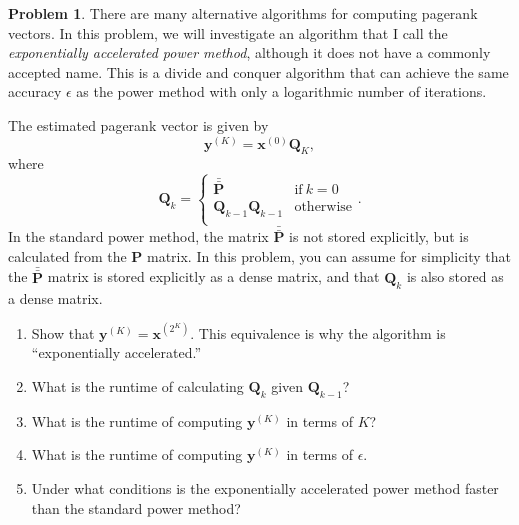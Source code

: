 \documentclass[10pt]{article}
\theoremstyle{definition}
\newtheorem{problem}{Problem}
\newcommand{\Q}{\mathbf Q}
\newcommand{\p}{\mathbf P}
\newcommand{\pb}{\bar {\p}}
\newcommand{\pbb}{\bar {\pb}}
\newcommand{\x}{\mathbf x}
\newcommand{\y}{\mathbf y}
\begin{document}
\begin{problem}
    There are many alternative algorithms for computing pagerank vectors.
    In this problem, we will investigate an algorithm that I call the \emph{exponentially accelerated power method},
    although it does not have a commonly accepted name.
    This is a divide and conquer algorithm that can achieve the same accuracy $\epsilon$ as the power method with only a logarithmic number of iterations.

    The estimated pagerank vector is given by
    \begin{equation}
        \y^{(K)} = \x^{(0)} \Q_K
        ,
    \end{equation}
    where
    \begin{equation}
        \Q_k = 
        \begin{cases}
            \pbb & \text{if}~k=0 \\
            \Q_{k-1} \Q_{k-1} & \text{otherwise} \\
        \end{cases}
        .
    \end{equation}
    In the standard power method, the matrix $\pbb$ is not stored explicitly,
    but is calculated from the $\p$ matrix.
    In this problem, you can assume for simplicity that the $\pbb$ matrix is stored explicitly as a dense matrix,
    and that $\Q_k$ is also stored as a dense matrix.

    \begin{enumerate}
        \item
            Show that $\y^{(K)} = \x^{(2^K)}$.
            This equivalence is why the algorithm is ``exponentially accelerated.''
            \vspace{3in}

        \item
            What is the runtime of calculating $\Q_k$ given $\Q_{k-1}$? 
            \vspace{4in}

        \item 
            What is the runtime of computing $\y^{(K)}$ in terms of $K$?
            \vspace{4.5in}

        \item
            What is the runtime of computing $\y^{(K)}$ in terms of $\epsilon$.
            \vspace{4.5in}

        \item
            Under what conditions is the exponentially accelerated power method faster than the standard power method?
            \vspace{3in}


\end{enumerate}
\end{problem}
\end{document}

